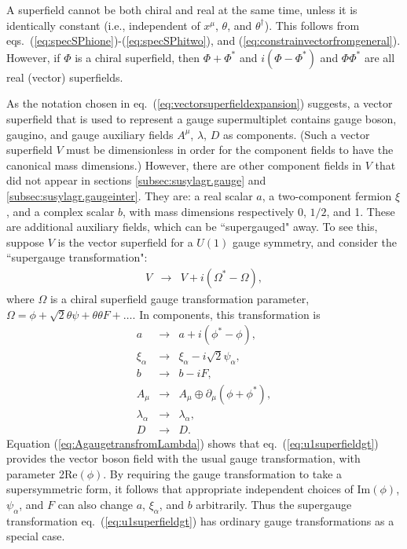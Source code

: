 \documentclass[11pt]{article}
\def\BDminus{-}
\def\BDminus{+}
\def\BDminus{\ominus}
\def\BDminus{\oplus}
\def\beq{\begin{eqnarray}}
\def\eeq{\end{eqnarray}}
\begin{document}
A superfield cannot be both chiral and real at the same time, 
unless it is identically constant (i.e., independent of $x^\mu$, $\theta$, 
and $\theta^\dagger$). This follows from 
eqs.~(\ref{eq:specSPhione})-(\ref{eq:specSPhitwo}), and
(\ref{eq:constrainvectorfromgeneral}).
However, if $\Phi$ is a chiral superfield, then $\Phi+\Phi^*$ and
$i (\Phi - \Phi^*)$ and $\Phi \Phi^*$ are all real (vector) superfields.

As the notation chosen in 
eq.~(\ref{eq:vectorsuperfieldexpansion}) suggests,
a vector superfield that is used to represent a gauge supermultiplet contains 
gauge boson, gaugino, and gauge auxiliary fields $A^\mu$, $\lambda$, $D$
as components. (Such a vector superfield $V$ must be dimensionless in order for the component fields to have the canonical mass dimensions.) 
However, there are other component fields in $V$ that did 
not appear in sections \ref{subsec:susylagr.gauge} and 
\ref{subsec:susylagr.gaugeinter}.
They are: a real scalar $a$, a two-component fermion $\xi$, 
and a complex scalar $b$, with mass dimensions
respectively 0, $1/2$, and 1. These are additional auxiliary fields, 
which can be ``supergauged" away.
To see this, suppose $V$ is the vector superfield for a $U(1)$ 
gauge symmetry, and consider the ``supergauge transformation":
\beq
V &\rightarrow & V + i (\Omega^* - \Omega),
\label{eq:u1superfieldgt}
\eeq
where $\Omega$ is a chiral superfield gauge transformation parameter,
$\Omega = \phi + \sqrt{2}\theta \psi + \theta\theta F+\ldots$. 
In components, this transformation is
\beq
a &\rightarrow& a + i (\phi^* - \phi),
\\
\xi_\alpha &\rightarrow& \xi_\alpha - i\sqrt{2} \psi_\alpha ,
\\
b &\rightarrow& b - iF ,
\\
A_\mu &\rightarrow& A_\mu \BDminus \partial_\mu (\phi + \phi^*) ,
\label{eq:AgaugetransfromLambda}
\\
\lambda_\alpha &\rightarrow& \lambda_\alpha ,
\\
D &\rightarrow& D.
\label{eq:DgaugetransfromLambda}
\eeq
Equation (\ref{eq:AgaugetransfromLambda}) 
shows that eq.~(\ref{eq:u1superfieldgt}) provides the vector 
boson field with the usual gauge transformation, with parameter 2Re$(\phi)$.
By requiring the gauge transformation to take a supersymmetric 
form, it follows that 
appropriate independent choices of 
Im$(\phi)$, $\psi_\alpha$, and $F$ can also change $a$, $\xi_\alpha$,
and $b$ arbitrarily.
Thus the supergauge transformation 
eq.~(\ref{eq:u1superfieldgt}) has ordinary gauge transformations as a 
special case. 
\end{document}
